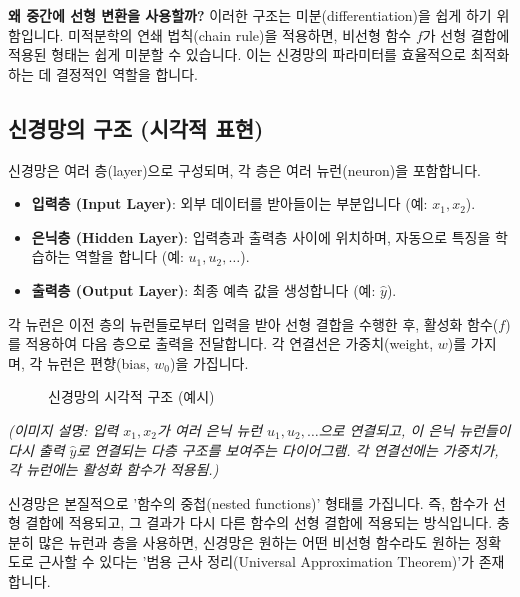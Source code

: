 \documentclass[11pt,a4paper]{article}
\theoremstyle{definition}
\begin{document}
\begin{infobox}
\textbf{왜 중간에 선형 변환을 사용할까?}
이러한 구조는 미분(differentiation)을 쉽게 하기 위함입니다.
미적분학의 연쇄 법칙(chain rule)을 적용하면, 비선형 함수 $f$가 선형 결합에 적용된 형태는 쉽게 미분할 수 있습니다.
이는 신경망의 파라미터를 효율적으로 최적화하는 데 결정적인 역할을 합니다.
\end{infobox}

\subsection*{신경망의 구조 (시각적 표현)}
신경망은 여러 층(layer)으로 구성되며, 각 층은 여러 뉴런(neuron)을 포함합니다.
\begin{itemize}
    \item \textbf{입력층 (Input Layer)}: 외부 데이터를 받아들이는 부분입니다 (예: $x_1, x_2$).
    \item \textbf{은닉층 (Hidden Layer)}: 입력층과 출력층 사이에 위치하며, 자동으로 특징을 학습하는 역할을 합니다 (예: $u_1, u_2, \dots$).
    \item \textbf{출력층 (Output Layer)}: 최종 예측 값을 생성합니다 (예: $\hat{y}$).
\end{itemize}
각 뉴런은 이전 층의 뉴런들로부터 입력을 받아 선형 결합을 수행한 후, 활성화 함수($f$)를 적용하여 다음 층으로 출력을 전달합니다.
각 연결선은 가중치(weight, $w$)를 가지며, 각 뉴런은 편향(bias, $w_0$)을 가집니다.

\begin{figure}[h!]
\centering
\caption{신경망의 시각적 구조 (예시)}
\label{fig:nn_structure}
\end{figure}
\begin{center}
\textit{(이미지 설명: 입력 $x_1, x_2$가 여러 은닉 뉴런 $u_1, u_2, \dots$으로 연결되고, 이 은닉 뉴런들이 다시 출력 $\hat{y}$로 연결되는 다층 구조를 보여주는 다이어그램. 각 연결선에는 가중치가, 각 뉴런에는 활성화 함수가 적용됨.)}
\end{center}

신경망은 본질적으로 '함수의 중첩(nested functions)' 형태를 가집니다.
즉, 함수가 선형 결합에 적용되고, 그 결과가 다시 다른 함수의 선형 결합에 적용되는 방식입니다.
충분히 많은 뉴런과 층을 사용하면, 신경망은 원하는 어떤 비선형 함수라도 원하는 정확도로 근사할 수 있다는 '범용 근사 정리(Universal Approximation Theorem)'가 존재합니다.
\end{document}
